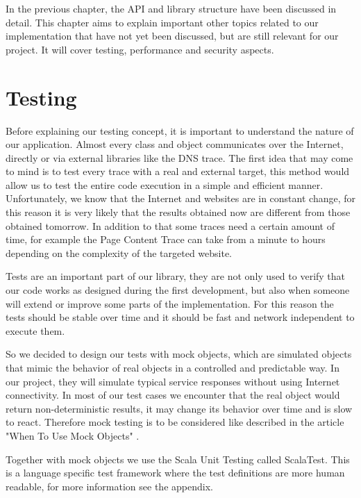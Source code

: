 \documentclass[
	a4paper,					10pt,							twoside,					openright,				notitlepage,			parskip=half,			]{scrreprt}
\begin{document}
In the previous chapter, the \gls{API} and library structure have been discussed in detail. 
This chapter aims to explain important other topics related to our implementation that have not yet been discussed, but are still relevant for our project.
It will cover testing, performance and security aspects.

\section{Testing}
\label{sec:secperf_testing}

Before explaining our testing concept, it is important to understand the nature of our application.
Almost every class and object communicates over the Internet, directly or via external libraries like the \gls{DNS} trace.
The first idea that may come to mind is to test every trace with a real and external target, 
this method would allow us to test the entire code execution in a simple and efficient manner.
Unfortunately, we know that the Internet and websites are in constant change, for this reason it is 
very likely that the results obtained now are different from those obtained tomorrow. 
In addition to that some traces need a certain amount of time, for example the Page Content Trace can take 
from a minute to hours depending on the complexity of the targeted website.

Tests are an important part of our library, they are not only used to verify that our code works as designed 
during the first development, but also when someone will extend or improve some parts of the implementation. 
For this reason the tests should be stable over time and it should be fast and network independent to execute them.

So we decided to design our tests with mock objects, which are simulated objects that mimic the behavior of real 
objects in a controlled and predictable way. In our project, they will simulate typical service responses without 
using Internet connectivity. In most of our test cases we encounter that the real object would return
non-deterministic results, it may change its behavior over time and is slow to react. Therefore mock testing is to be
considered like described in the article "When To Use Mock Objects" \cite{page:mockobject}.

Together with mock objects we use the Scala Unit Testing called ScalaTest. This is a language specific test framework 
where the test definitions are more human readable, for more information see the  appendix.
\end{document}
